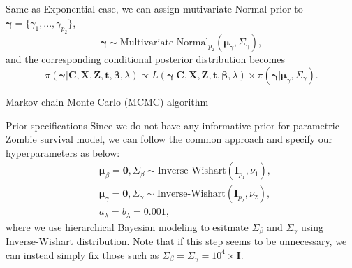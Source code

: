 \documentclass[a4paper, 12pt]{article}
\makeatletter
\renewcommand{\section}{\@startsection
	{section}    {1}    {0mm}    {-0.7\baselineskip}    {0.08\baselineskip}    {\normalfont\large\sc\center\bf}}
\renewcommand{\subsection}{\@startsection
	{subsection}    {2}    {0mm}    {-0.5\baselineskip}    {0.01\baselineskip}    {\normalfont\normalsize\itshape\center}}
\makeatother
\begin{document}
Same as Exponential case, we can assign mutivariate Normal prior to $\mathbf{\gamma}=\{\gamma_1,...,\gamma_{p_2}\}$,
\begin{equation}
\mathbf{\gamma} \sim \mbox{Multivariate Normal}_{p_2}(\mathbf{\mu}_{\gamma}, \Sigma_{\gamma}),
\end{equation}
and the corresponding conditional posterior distribution becomes 
\begin{equation}
\pi(\mathbf{\gamma}|\mathbf{C}, \mathbf{X}, \mathbf{Z}, \mathbf{t}, \mathbf{\beta}, \lambda) \propto L(\mathbf{\gamma}|\mathbf{C}, \mathbf{X}, \mathbf{Z}, \mathbf{t}, \mathbf{\beta}, \lambda)\times \pi(\mathbf{\gamma}|\mathbf{\mu}_{\gamma}, \Sigma_{\gamma}).
\end{equation}
\section{Markov chain Monte Carlo (MCMC) algorithm}
\subsection{Prior specifications}
\noindent Since we do not have any informative prior for parametric Zombie survival model, we can follow the common approach and specify our hyperparameters as below:  
\begin{equation}
\begin{aligned}
&\mathbf{\mu}_{\beta} = \mathbf{0}, \Sigma_{\beta} \sim \mbox{Inverse-Wishart}(\mathbf{I}_{p_1}, \nu_1),\\
& \mathbf{\mu}_{\gamma} = \mathbf{0}, \Sigma_{\gamma} \sim \mbox{Inverse-Wishart}(\mathbf{I}_{p_2}, \nu_2), \\
& a_{\lambda} =  b_{\lambda} = 0.001,
\end{aligned}
\end{equation}
where we use hierarchical Bayesian modeling to esitmate $\Sigma_{\beta}$ and $\Sigma_{\gamma}$ using Inverse-Wishart distribution. Note that if this step seems to be unnecessary, we can instead simply fix those such as $\Sigma_{\beta} =\Sigma_{\gamma} = 10^4\times\mathbf{I}$. 
\end{document}

